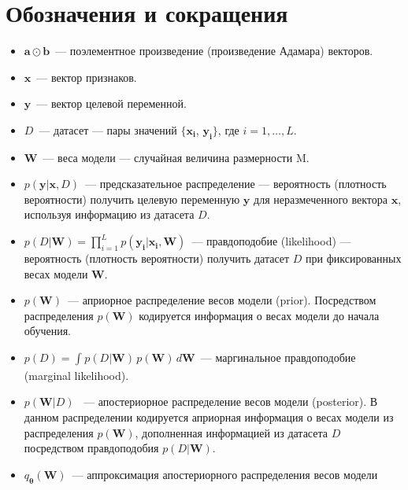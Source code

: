 \documentclass{article}
\numberwithin{equation}{section}
\begin{document}
    \section{Обозначения и сокращения}
    \begin{itemize}
        \item $\pmb{a} \odot \pmb{b}$~--- поэлементное произведение (произведение Адамара) векторов.
        \item $\pmb{x}$~--- вектор признаков.
        \item $\pmb{y}$~--- вектор целевой переменной.
        \item $D$~--- датасет --- пары значений $\{\pmb{x_i}$, $\pmb{y_i}\}$, где $i = 1, \dots, L$.
        \item $\pmb{W}$~--- веса модели --- случайная величина размерности M.
        \item $p(\pmb{y} | \pmb{x}, D)$~--- предсказательное распределение
            --- вероятность (плотность вероятности) получить целевую переменную $\pmb{y}$
            для неразмеченного вектора $\pmb{x}$, используя информацию из датасета $D$.
        \item $
                p(D | \pmb{W})
                =
                \prod_{i=1}^{L}{
                    p(\pmb{y_i} | \pmb{x_i}, \pmb{W})
                }
              $~--- правдоподобие (likelihood)
              --- вероятность (плотность вероятности) получить датасет $D$
              при фиксированных весах модели $\pmb{W}$.
        \item $p(\pmb{W})$~--- априорное распределение весов модели (prior).
            Посредством распределения $p(\pmb{W})$ кодируется информация о весах модели
            до начала обучения.
        \item
            $
            p(D) = \int_{}{
                p(D | \pmb{W})
                \,
                p(\pmb{W})
                \,
                d\pmb{W}
            }
            $~--- маргинальное правдоподобие (marginal likelihood).
        \item
            $
                p(\pmb{W}| D)
            $
            ~--- апостериорное распределение весов модели (posterior).
            В данном распределении кодируется априорная информация о весах модели из
            распределения $p(\pmb{W})$, дополненная информацией из датасета $D$
            посредством правдоподобия $p(D | \pmb{W})$.
        \item $q_{\pmb{\theta}}(\pmb{W})$~--- аппроксимация апостериорного распределения весов модели

\end{itemize}
\end{document}

